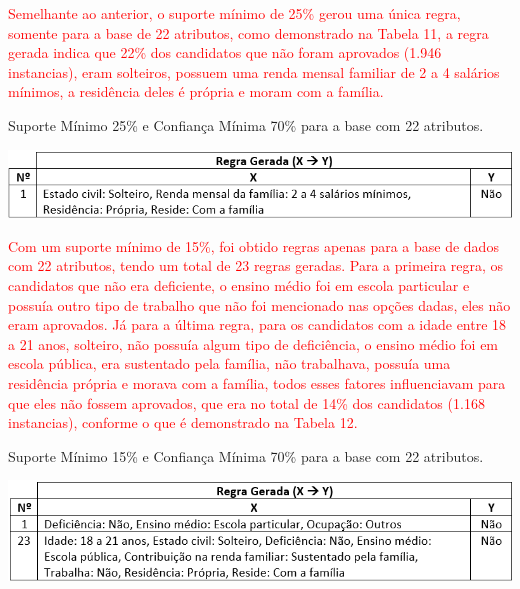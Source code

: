 \par
\textcolor{red}{Semelhante ao anterior, o suporte mínimo de 25\% gerou uma única regra, somente para a base de 22 atributos, como demonstrado na Tabela 11, a regra gerada indica que 22\% dos candidatos que não foram aprovados (1.946 instancias), eram solteiros, possuem uma renda mensal familiar de 2 a 4 salários mínimos, a residência deles é própria e moram com a família.}

\par
\begin{table}[!htp]
	\begin{center}
    \caption{\label{fig:waveform_fig} Suporte Mínimo 25\% e Confiança Mínima 70\% para a base com 22 atributos.}
	\includegraphics[scale=0.75]{Figuras/Suporte_25_Nao_atributos_22.png}
	\end{center}
\end{table}

\par
\textcolor{red}{Com um suporte mínimo de 15\%, foi obtido regras apenas para a base de dados com 22 atributos, tendo um total de 23 regras geradas. Para a primeira regra, os candidatos que não era deficiente, o ensino médio foi em escola particular e possuía outro tipo de trabalho que não foi mencionado nas opções dadas, eles não eram aprovados. Já para a última regra, para os candidatos com a idade entre 18 a 21 anos, solteiro, não possuía algum tipo de deficiência, o ensino médio foi em escola pública, era sustentado pela família, não trabalhava, possuía uma residência própria e morava com a família, todos esses fatores influenciavam para que eles não fossem aprovados, que era no total de 14\% dos candidatos (1.168 instancias), conforme o que é demonstrado na Tabela 12.}

\par
\begin{table}[!htp]
	\begin{center}
    \caption{\label{fig:waveform_fig} Suporte Mínimo 15\% e Confiança Mínima 70\% para a base com 22 atributos.}
	\includegraphics[scale=0.75]{Figuras/Suporte_15_Nao_atributos_22.png}
	\end{center}
\end{table}